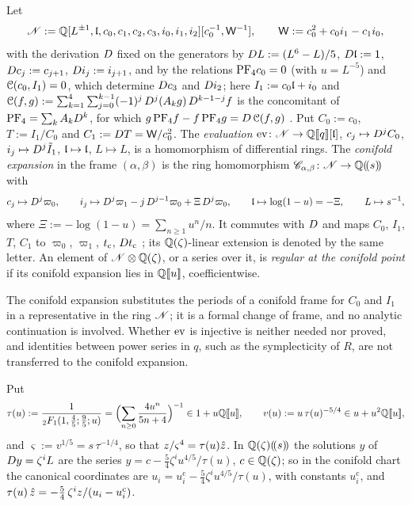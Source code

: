 \begin{defn}
\label{def:set-confexp}
Let
\[
\mathscr{N}:=\mathbb{Q}[L^{\pm1},\mathfrak{l},c_0,c_1,c_2,c_3,i_0,i_1,i_2][c_0^{-1},\mathsf W^{-1}],\qquad\mathsf W:=c_0^2+c_0i_1-c_1i_0,
\]
with the derivation $D$ fixed on the generators by $D L:=(L^6-L)/5$, $D\mathfrak{l}:=1$, $D c_j:=c_{j+1}$, $D i_j:=i_{j+1}$, and by the relations $\mathrm{PF}_{4} c_0=0$ (with $u=L^{-5}$) and $\mathcal{C}(c_0,I_1)=0$, which determine $D c_3$ and $D i_2$; here $I_1:=c_0\mathfrak{l}+i_0$ and $\mathcal{C}(f,g):=\sum_{k=1}^4\sum_{j=0}^{k-1}(-1)^j\,D^j(A_kg)\,D^{k-1-j}f$ is the concomitant of $\mathrm{PF}_{4}=\sum_kA_kD^k$, for which $g\,\mathrm{PF}_{4} f-f\,\mathrm{PF}_{4} g=D\,\mathcal{C}(f,g)$ . Put $C_0:=c_0$, $T:=I_1/C_0$ and $C_1:=D T=\mathsf W/c_0^2$. The \emph{evaluation} $\operatorname{ev}\colon\mathscr{N}\to\mathbb{Q}[\![ q ]\!][\mathfrak{l}]$, $c_j\mapsto D^jC_0$, $i_j\mapsto D^j\tilde I_1$, $\mathfrak{l}\mapsto\mathfrak{l}$, $L\mapsto L$, is a homomorphism of differential rings. The \emph{conifold expansion} in the frame $(\alpha,\beta)$ is the ring homomorphism $\mathscr{C}_{\alpha,\beta}\colon\mathscr{N}\to\mathbb{Q}(\!(s)\!)$ with
\[
c_j\mapsto D^j\varpi_0,\qquad i_j\mapsto D^j\varpi_1-j\,D^{j-1}\varpi_0+\Xi\,D^j\varpi_0,\qquad\mathfrak{l}\mapsto\log(1-u)=-\Xi,\qquad L\mapsto s^{-1},
\]
where $\Xi:=-\log(1-u)=\sum_{n\geq1}u^n/n$. It commutes with $D$ and maps $C_0$, $I_1$, $T$, $C_1$ to $\varpi_0$, $\varpi_1$, $t_{\mathrm{c}}$, $Dt_{\mathrm{c}}$ ; its $\mathbb{Q}(\zeta)$-linear extension is denoted by the same letter. An element of $\mathscr{N}\otimes\mathbb{Q}(\zeta)$, or a series over it, is \emph{regular at the conifold point} if its conifold expansion lies in $\mathbb{Q}[\![ u ]\!]$, coefficientwise.
\end{defn}

The conifold expansion substitutes the periods of a conifold frame for $C_0$ and $I_1$ in a representative in the ring $\mathscr{N}$; it is a formal change of frame, and no analytic continuation is involved. Whether $\operatorname{ev}$ is injective is neither needed nor proved, and identities between power series in $q$, such as the symplecticity of $R$, are not transferred to the conifold expansion.

\begin{defn}
\label{def:set-tau}
Put
\[
\tau(u):=\frac1{{}_2F_1(1,\frac45;\frac95;u)}=\Bigl(\sum_{n\geq0}\frac{4u^n}{5n+4}\Bigr)^{-1}\in1+u\mathbb{Q}[\![ u ]\!],\qquad v(u):=u\,\tau(u)^{-5/4}\in u+u^2\mathbb{Q}[\![ u ]\!],
\]
and $\varsigma:=v^{1/5}=s\,\tau^{-1/4}$, so that $z/\varsigma^4=\tau(u)\hat{z}$. In $\mathbb{Q}(\zeta)(\!(s)\!)$ the solutions $y$ of $D y=\zeta^iL$ are the series $y=c-\frac54\zeta^iu^{4/5}/\tau(u)$, $c\in\mathbb{Q}(\zeta)$; so in the conifold chart the canonical coordinates are $u_i=u_i^{\mathrm c}-\frac54\zeta^iu^{4/5}/\tau(u)$, with constants $u_i^{\mathrm c}$, and $\tau(u)\,\hat{z}=-\frac54\,\zeta^iz/(u_i-u_i^{\mathrm c})$.
\label{lem:set-canon}
\end{defn}




